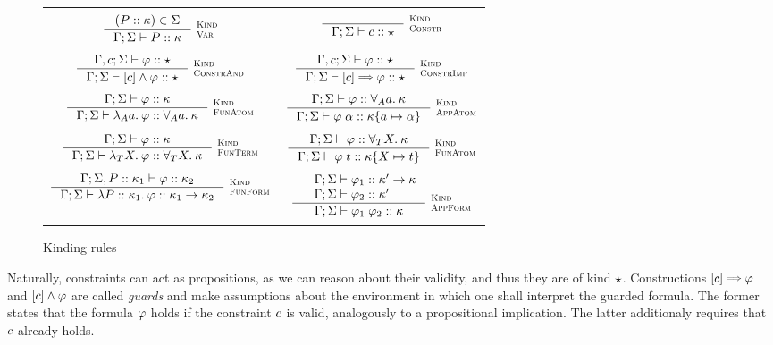 \documentclass[english, mgr]{iithesis}
\renewcommand{\it}[1]{\textit{#1}}
\newcommand{\scbrk}[2]{\myatop{\textsc{#1}}{\textsc{#2}}}
\begin{document}
\begin{figure}[htpb]
  \begin{tabularx}{\textwidth}{|CC|}
    \hline & \\
     $\inference{
      (\propv \ofkind \kind) \in  \kEnv
  }{
    \cEnv; \kEnv \vdash \propv \ofkind \kind
  }\:\scbrk{Kind}{Var}
  $ &
     $\inference{
  }{
    \cEnv; \kEnv \vdash \fConstr{\constr} \ofkind \kProp
  }\:\scbrk{Kind}{Constr}
  $ \\ & \\ $
  \inference{
    \cEnv,\constr; \kEnv \vdash \formphi \ofkind \kProp
  }{
    \cEnv; \kEnv \vdash \fCAnd{\constr} \formphi \ofkind \kProp
  }\:\scbrk{Kind}{ConstrAnd}
  $ & $
  \inference{
    \cEnv,\constr; \kEnv \vdash \formphi \ofkind \kProp
  }{
    \cEnv; \kEnv \vdash \fCImp{\constr} \formphi \ofkind \kProp
  }\:\scbrk{Kind}{ConstrImp}$ \\ & \\
    $\inference{
      \cEnv; \kEnv \vdash \formphi \ofkind \kind
    }{
      \cEnv; \kEnv \vdash \fLamAtom{\atomv} \formphi \ofkind \kForallAtom{\atomv}\kind
    }\:\scbrk{Kind}{FunAtom}$
    &
    $\inference{
      \cEnv;\kEnv\vdash \formphi \ofkind \kForallAtom{\atomv}\kind
    }{
      \cEnv;\kEnv\vdash \formphi \fAppAtom{\atomexp} \ofkind \kind \subst{\atomv}{\atomexp}
    }\:\scbrk{Kind}{AppAtom}$
    \\ & \\
    $\inference{
      \cEnv; \kEnv \vdash \formphi \ofkind \kind
    }{
      \cEnv; \kEnv \vdash \fLamTerm{\termv} \formphi \ofkind \kForallTerm{\termv}\kind
    }\:\scbrk{Kind}{FunTerm}$
    &
    $\inference{
      \cEnv;\kEnv\vdash \formphi \ofkind \kForallTerm{\termv}\kind
    }{
      \cEnv;\kEnv\vdash \formphi \fAppTerm{\term} \ofkind \kind\subst{\termv}{\term}
    }\:\scbrk{Kind}{FunAtom}$
    \\ & \\
    $\inference{
      \cEnv; \kEnv, \propv \ofkind \kind_1 \vdash \formphi \ofkind \kind_2
    }{
      \cEnv; \kEnv \vdash \fLamForm{\propv}{\kind_1} \formphi \ofkind \kind_1 \karrow \kind_2
    }\:\scbrk{Kind}{FunForm}$
    &
    $\inference{
      \quad \cEnv; \kEnv \vdash \formphi_1 \ofkind \kind' \karrow \kind
      \\
      \quad \cEnv; \kEnv \vdash \formphi_2 \ofkind \kind' \hfill
    }{
      \cEnv;\kEnv\vdash \formphi_1 \fApp \formphi_2 \ofkind \kind
    }\:\scbrk{Kind}{AppForm}$
    \\ & \\
    \hline
\end{tabularx}
  \caption{Kinding rules}
  \label{fig:kinding}
\end{figure}
Naturally, constraints can act as propositions, as we can reason about their
validity, and thus they are of kind $\star$.
Constructions $\fCImp{\constr} \formphi$ and $[c]\wedge \varphi$
are called \it{guards} and make assumptions about the environment in which
one shall interpret the guarded formula.
The former states that the formula $\varphi$ holds if the constraint $c$ is valid,
analogously to a propositional implication.
The latter additionaly requires that $c$ already holds.
\end{document}
